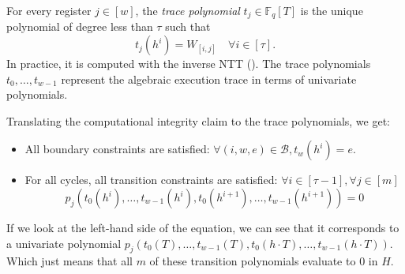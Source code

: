 \documentclass[../../book]{subfiles}
\begin{document}
For every register $j \in [w]$, the \emph{trace polynomial} $t_j \in \mathbb{F}_q[T]$ is the unique polynomial of degree less than $\tau$ such that
\begin{equation*}
  t_j(h^i) = W_{[i,j]} \quad \forall i \in [\tau].
\end{equation*}
In practice, it is computed with the inverse NTT (). The trace polynomials
$t_0, \ldots, t_{w-1}$ represent the algebraic execution trace in terms of univariate polynomials.

Translating the computational integrity claim to the trace polynomials, we get:
\begin{itemize}
  \item All boundary constraints are satisfied: $\forall (i,w,e)\in \mathcal{B}, t_w(h^i)=e$.
  \item For all cycles, all transition constraints are satisfied: $\forall i\in [\tau-1],\forall j\in[m]$
  \begin{equation*}
    p_j(t_0(h^i),\dots,t_{w-1}(h^i),t_0(h^{i+1}),\dots,t_{w-1}(h^{i+1}))=0
  \end{equation*}
\end{itemize}
If we look at the left-hand side of the equation, we can see that it corresponds to a univariate polynomial $p_j(t_0(T),\dots,t_{w-1}(T),t_0(h\cdot T),\dots,t_{w-1}(h\cdot T))$. Which just means that all $m$ of these transition polynomials evaluate to $0$ in $H$.
\end{document}
